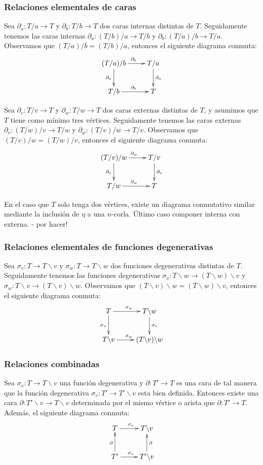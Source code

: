 \documentclass[11pt,a4paper,openright,oneside]{article}
\numberwithin{equation}{section}
\theoremstyle{definition}
\begin{document}
\subsubsection*{Relaciones elementales de caras}
Sea $\partial_a \colon T/a\to T$ y $\partial_b \colon T/b\to T$ dos caras internas distintas de $T$.
Seguidamente tenemos las caras internas $\partial_a \colon (T/b)/a \to T/b$ y $\partial_b \colon (T/a)/b \to T/a$. Observamos que $(T/a)/b = (T/b)/a$, entonces el siguiente diagrama conmuta:
$$
    \xymatrix{
        (T/a)/b \ar[d]_{\partial_a} \ar[r]^{\partial_b}
        &T/a \ar[d]^{\partial_a} \\
        T/b \ar[r]^{\partial_b}
        &T
    }
$$

Sea $\partial_v \colon T/v\to T$ y $\partial_w \colon T/w\to T$ dos caras externas distintas de $T$, y asumimos que $T$ tiene como m\'inimo tres v\'ertices.
Seguidamente tenemos las caras externas $\partial_v \colon (T/w)/v \to T/w$ y $\partial_w \colon (T/v)/w \to T/v$. Observamos que $(T/v)/w = (T/w)/v$, entonces el siguiente diagrama conmuta:
$$
    \xymatrix{
        (T/v)/w \ar[d]_{\partial_v} \ar[r]^{\partial_w}
        &T/v \ar[d]^{\partial_v} \\
        T/w \ar[r]^{\partial_w}
        &T
    }
$$

En el caso que $T$ solo tenga dos v\'ertices, existe un diagrama conmutativo similar mediante la inclusi\'on de $\eta$ a una $n$-corla.
\'Ultimo caso componer interna con externa. - por hacer!

\subsubsection*{Relaciones elementales de funciones degenerativas}
Sea $\sigma_v \colon T\to T\backslash v$ y $\sigma_w \colon T\to T\backslash w$ dos funciones degenerativas distintas de $T$.
Seguidamente tenemos las funciones degenerativas $\sigma_v \colon T\backslash w \to (T\backslash w)\backslash v$ y $\sigma_w \colon T\backslash v \to (T\backslash v)\backslash w$. Observamos que $(T\backslash v)\backslash w = (T\backslash w)\backslash v$, entonces el siguiente diagrama conmuta:
$$
    \xymatrix{
        T \ar[d]_{\sigma_v} \ar[r]^{\sigma_w}
        &T\backslash w \ar[d]^{\sigma_v} \\
        T\backslash v \ar[r]^{\sigma_w}
        &(T\backslash v)\backslash w
    }
$$

\subsubsection*{Relaciones combinadas}
Sea $\sigma_v\colon T\to T\backslash v$ una funci\'on degenerativa y $\partial\colon T' \to T$ es una cara de tal manera que la funci\'on degenerativa $\sigma_v\colon T'\to T'\backslash v$ esta bien definida. Entonces existe una cara $\partial\colon T'\backslash v \to T\backslash v$ determinada por el mismo v\'ertice o arista que $\partial\colon T' \to T$.
Adem\'as, el siguiente diagrama conmuta:
$$
    \xymatrix{
        T  \ar[r]^{\sigma_v}
        &T\backslash v \\
        T' \ar[u]^{\partial} \ar[r]^{\sigma_v}
        &T'\backslash v \ar[u]_{\partial}
    }
$$
\end{document}
